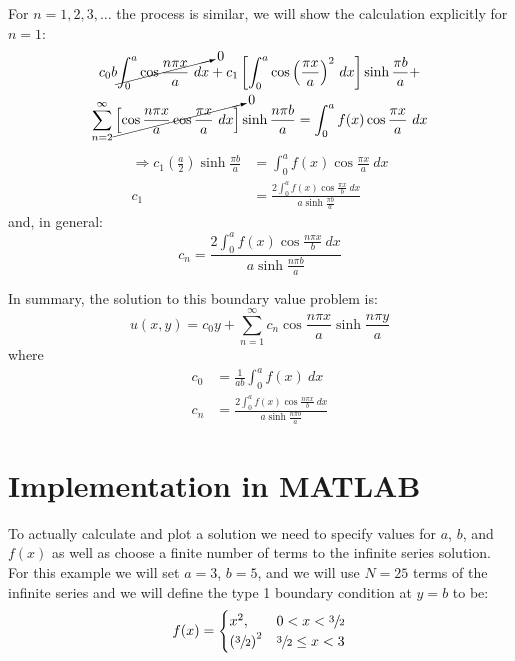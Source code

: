 \vspace{0.25cm}

\noindent For $n=1,2,3,\dots$ the process is similar, we will show the calculation explicitly for $n=1$:
\begin{multline*}
c_0b\cancelto{0}{\int_{0}^{a} \cos{\frac{n \pi x}{a}} \ dx} + c_1\left[\int_0^a \cos{\left(\frac{\pi x}{a}\right)}^2 \ dx \right]\sinh{\frac{\pi b}{a}} + \\ \sum\limits_{n=2}^{\infty} \cancelto{0}{\left[\cos{\frac{n \pi x}{a}}\cos{\frac{ \pi x}{a}} \ dx \right]}\sinh{\frac{n \pi b}{a}} = \int_0^a f(x) \cos{\frac{\pi x}{a}} \ dx 
\end{multline*}
\begin{align*}
\Rightarrow c_1 \left(\frac{a}{2} \right)\sinh{\frac{\pi b}{a}} &= \int_0^a f(x) \cos{\frac{\pi x}{a}} \ dx \\
c_1 &= \frac{2\int_0^a f(x) \cos{\frac{\pi x}{b}} \ dx}{a \sinh{\frac{\pi b}{a}}}
\end{align*}
and, in general:
\begin{equation*}
c_n = \frac{2\int_0^a f(x) \cos{\frac{n \pi x}{b}} \ dx}{a \sinh{\frac{n \pi b}{a}}}
\end{equation*}

\vspace{0.25cm}

\noindent In summary, the solution to this boundary value problem is:
\begin{equation*}
u(x,y) = c_0y + \sum\limits_{n=1}^{\infty} c_n \cos{\frac{n \pi x}{a}} \sinh{\frac{n \pi y}{a}}
\end{equation*}
where
\begin{align*}
c_0 &= \frac{1}{ab}\int_0^a f(x) \ dx \\
c_n &= \frac{2\int_0^a f(x) \cos{\frac{n \pi x}{b}} \ dx}{a \sinh{\frac{n \pi b}{a}}}
\end{align*}

\section{Implementation in MATLAB}

To actually calculate and plot a solution we need to specify values for $a$, $b$, and $f(x)$ as well as choose a finite number of terms to the infinite series solution.  For this example we will set $a=3$, $b=5$, and we will use $N=25$ terms of the infinite series and we will define the type 1 boundary condition at $y=b$ to be:
\begin{equation*}
f(x) = 
\begin{cases}
x^2, & 0 < x < \sfrac{3}{2} \\
\left(\sfrac{3}{2} \right)^2 & \sfrac{3}{2} \le x < 3
\end{cases}
\end{equation*}

